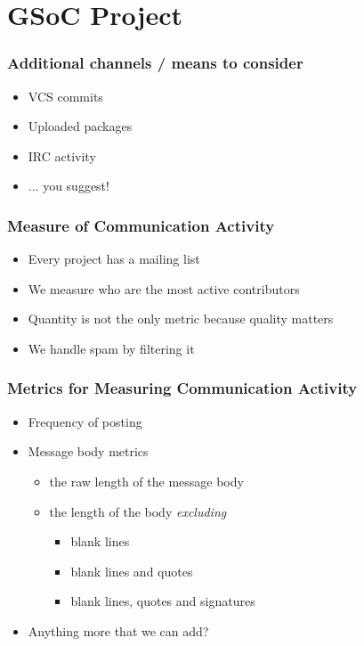\documentclass[compress]{beamer}
\begin{document}
\section{GSoC Project}

\begin{frame}
  \frametitle{Additional channels / means %
              to consider
             }
  \begin{itemize}
    \item VCS commits
    \item Uploaded packages
    \item IRC activity %
    \item ... you suggest!
  \end{itemize}
\end{frame}

\begin{frame}
  \frametitle{Measure of Communication Activity}
  \begin{itemize}
     \item Every project has a mailing list
     \item We measure who are the most active contributors
     \item Quantity is not the only metric because quality matters 
     \item We handle spam by filtering it
  \end{itemize}
\end{frame}

\begin{frame}
 \frametitle{Metrics for Measuring Communication Activity}
 \begin{itemize}
    \item Frequency of posting 
    \pause
    \item Message body metrics 
    \begin{itemize}
        \item the raw length of the message body
        \pause
        \item the length of the body \textit{excluding}
        \begin{itemize}
            \item blank lines
            \pause
            \item blank lines and quotes
            \pause
            \item blank lines, quotes and signatures
            \pause
        \end{itemize}
    \end{itemize}
    \pause
    \item Anything more that we can add? 
 \end{itemize}
\end{frame}
\end{document}
